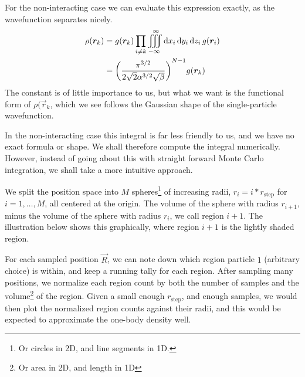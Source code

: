 \documentclass[twocolumn]{article}
\begin{document}
For the non-interacting case we can evaluate this expression exactly, as the
wavefunction separates nicely.
\begin{align}
    \begin{split}
        \rho(\bm r_k)&=g(\bm r_k)\prod_{i\neq k}\iiint_{-\infty}^\infty
        \dd{x_i}\dd{y_i}\dd{z_i}g(\bm r_i)\\
        &= \qty(\frac{\pi^{3/2}}{2\sqrt{2}\alpha^{3/2}\sqrt{\beta}})^{N-1}
        g(\bm r_k)\\
    \end{split}
\end{align}
The constant is of little importance to us, but what we want is the functional
form of $\rho(\vec r_k$, which we see follows the Gaussian shape of the
single-particle wavefunction.

In the non-interacting case this integral is far less friendly to us, and we have no
exact formula or shape. We shall therefore compute the integral numerically. However, 
instead of going about this with straight forward Monte Carlo integration, we
shall take a more intuitive approach.

We split the position space into $M$ spheres\footnote{Or circles in 2D, and line
segments in 1D.} of increasing radii, $r_i=i * r_\text{step}$ for $i=1,\dots,M$,
all centered at the origin. The volume of the sphere with radius $r_{i+1}$, minus
the volume of the sphere with radius $r_i$, we call region $i+1$. The
illustration below shows this graphically, where region $i+1$ is the lightly
shaded region.

\begin{center}
\end{center}

For each sampled position $\vec R$, we can note down which region particle $1$
(arbitrary choice) is within, and keep a running tally for each region. After
sampling many positions, we normalize each region count by both the number of
samples and the volume\footnote{Or area in 2D, and length in 1D} of the
region. Given a small enough $r_\text{step}$, and enough samples, we would then
plot the normalized region counts against their radii, and this would be expected
to approximate the one-body density well.
\end{document}
